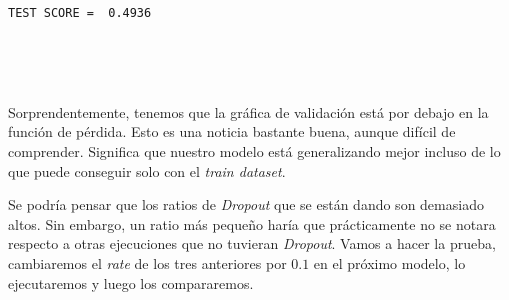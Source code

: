 \documentclass[11pt]{article}
\begin{document}
    \begin{Verbatim}[commandchars=\\\{\}]
TEST SCORE =  0.4936
    \end{Verbatim}

    \begin{center}
    \end{center}
    { \hspace*{\fill} \\}
    
    \begin{center}
    \end{center}
    { \hspace*{\fill} \\}
    
    Sorprendentemente, tenemos que la gráfica de validación está por debajo
en la función de pérdida. Esto es una noticia bastante buena, aunque
difícil de comprender. Significa que nuestro modelo está generalizando
mejor incluso de lo que puede conseguir solo con el \emph{train
dataset}.

Se podría pensar que los ratios de \emph{Dropout} que se están dando son
demasiado altos. Sin embargo, un ratio más pequeño haría que
prácticamente no se notara respecto a otras ejecuciones que no tuvieran
\emph{Dropout}. Vamos a hacer la prueba, cambiaremos el \emph{rate} de
los tres anteriores por \(0.1\) en el próximo modelo, lo ejecutaremos y
luego los compararemos.
\end{document}
